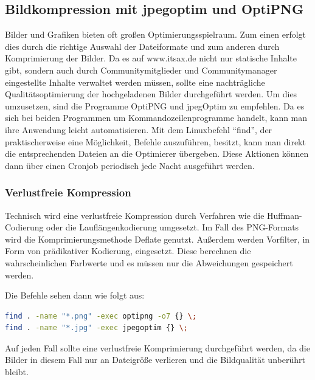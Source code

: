 
\subsection{Bildkompression mit jpegoptim und OptiPNG}
Bilder und Grafiken bieten oft großen Optimierungsspielraum. Zum einen erfolgt dies durch die richtige Auswahl der Dateiformate und zum anderen durch Komprimierung der Bilder. Da es auf www.itsax.de nicht nur statische Inhalte gibt, sondern auch durch Communitymitglieder und Communitymanager eingestellte Inhalte verwaltet werden müssen, sollte eine nachträgliche Qualitätsoptimierung der hochgeladenen Bilder durchgeführt werden. Um dies umzusetzen, sind die Programme OptiPNG und jpegOptim zu empfehlen. Da es sich bei beiden Programmen um Kommandozeilenprogramme handelt, kann man ihre Anwendung leicht automatisieren. Mit dem Linuxbefehl "`find"', der praktischerweise eine Möglichkeit, Befehle auszuführen, besitzt, kann man direkt die entsprechenden Dateien an die Optimierer übergeben. Diese Aktionen können dann über einen Cronjob periodisch jede Nacht ausgeführt werden. 

\subsubsection{Verlustfreie Kompression} 
Technisch wird eine verlustfreie Kompression durch Verfahren wie die Huffman-Codierung oder die Lauflängenkodierung umgesetzt. Im Fall des PNG-Formats wird die Komprimierungsmethode Deflate genutzt. Außerdem werden Vorfilter, in Form von prädikativer Kodierung, eingesetzt. Diese berechnen die wahrscheinlichen Farbwerte und es müssen nur die Abweichungen gespeichert werden. 

Die Befehle sehen dann wie folgt aus:
\begin{lstlisting}[language=bash,label=verlustfreies Optimieren mit "find",caption= verlustfreies Optimieren mit "find"]
find . -name "*.png" -exec optipng -o7 {} \;
find . -name "*.jpg" -exec jpegoptim {} \;
\end{lstlisting}

Auf jeden Fall sollte eine verlustfreie Komprimierung durchgeführt werden, da die Bilder in diesem Fall nur an Dateigröße verlieren und die Bildqualität unberührt bleibt. 

